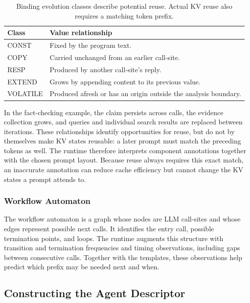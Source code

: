 \begin{table}[t]
\centering
\caption{Binding evolution classes describe potential reuse. Actual KV reuse also requires a matching token prefix.}
\label{tab:evolution_classes}
\setlength{\tabcolsep}{3pt}
\begin{tabular}{@{}p{}p{}@{}}
\hline
\textbf{Class} & \textbf{Value relationship} \\
\hline
CONST & Fixed by the program text. \\
COPY & Carried unchanged from an earlier call-site. \\
RESP & Produced by another call-site's reply. \\
EXTEND & Grows by appending content to its previous value. \\
VOLATILE & Produced afresh or has an origin outside the analysis boundary. \\
\hline
\end{tabular}
\end{table}

In the fact-checking example, the claim persists across calls, the evidence collection grows, and queries and individual search results are replaced between iterations. These relationships identify opportunities for reuse, but do not by themselves make KV states reusable: a later prompt must match the preceding tokens as well. The runtime therefore interprets component annotations together with the chosen prompt layout. Because reuse always requires this exact match, an inaccurate annotation can reduce cache efficiency but cannot change the KV states a prompt attends to.

\subsubsection{Workflow Automaton}
\label{sec:TPFM}

The workflow automaton is a graph whose nodes are LLM call-sites and whose edges represent possible next calls. It identifies the entry call, possible termination points, and loops. The runtime augments this structure with transition and termination frequencies and timing observations, including gaps between consecutive calls. Together with the templates, these observations help predict which prefix may be needed next and when.

\subsection{Constructing the Agent Descriptor}
\label{sec:analysis}

